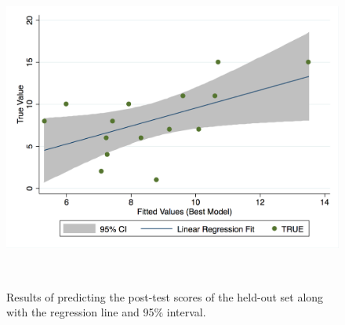 \documentclass{sigchi}
\begin{document}
\begin{figure}
	\centering
	\includegraphics[width=0.9\columnwidth]{figures/regression.png}
	\caption{Results of predicting the post-test scores of the held-out set along with the regression line and 95\% interval.}~\label{fig:regression}
\end{figure}
\end{document}
